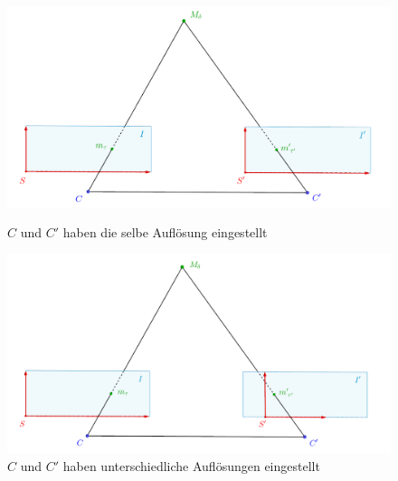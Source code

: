 


 




\begin{figure}[!htb]
	\includegraphics[width=\linewidth]{images/SensorSelbeAufloesung_beschriftet.png}
	\caption{$C$ und $C'$ haben die selbe Auflösung eingestellt}
	\label{fig:Aufl1}
	\endminipage\hfill
	\includegraphics[width=\linewidth]{images/SensorUnterschiedlicheAufloesung_beschriftet.png}
	\caption{$C$ und $C'$ haben unterschiedliche Auflösungen eingestellt}
	\label{fig:Aufl2}
	\endminipage\hfill
\end{figure}


